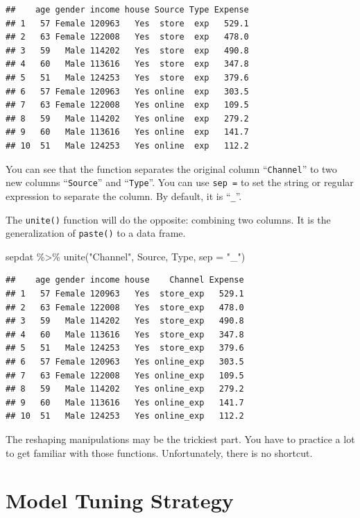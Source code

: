 \documentclass[
  12pt,
]{krantz}
\makeatletter
\newenvironment{Shaded}{\begin{snugshade}}{\end{snugshade}}
\newcommand{\AttributeTok}[1]{\textcolor[rgb]{0.61,0.61,0.61}{#1}}
\newcommand{\FunctionTok}[1]{\textcolor[rgb]{0,0,0}{#1}}
\newcommand{\NormalTok}[1]{#1}
\newcommand{\SpecialCharTok}[1]{\textcolor[rgb]{0,0,0}{#1}}
\newcommand{\StringTok}[1]{\textcolor[rgb]{0.5,0.5,0.5}{#1}}
\newenvironment{kframe}{%
\medskip{}
\setlength{\fboxsep}{.8em}
 \def\at@end@of@kframe{}%
 \ifinner\ifhmode%
  \def\at@end@of@kframe{\end{minipage}}%
  \begin{minipage}{\columnwidth}%
 \fi\fi%
 \def\FrameCommand##1{\hskip\@totalleftmargin \hskip-\fboxsep
 \colorbox{shadecolor}{##1}\hskip-\fboxsep
     \hskip-\linewidth \hskip-\@totalleftmargin \hskip\columnwidth}%
 \MakeFramed {\advance\hsize-\width
   \@totalleftmargin\z@ \linewidth\hsize
   \@setminipage}}%
 {\par\unskip\endMakeFramed%
 \at@end@of@kframe}
\renewenvironment{Shaded}{\begin{kframe}}{\end{kframe}}
\makeatother
\begin{document}
\begin{verbatim}
##    age gender income house Source Type Expense
## 1   57 Female 120963   Yes  store  exp   529.1
## 2   63 Female 122008   Yes  store  exp   478.0
## 3   59   Male 114202   Yes  store  exp   490.8
## 4   60   Male 113616   Yes  store  exp   347.8
## 5   51   Male 124253   Yes  store  exp   379.6
## 6   57 Female 120963   Yes online  exp   303.5
## 7   63 Female 122008   Yes online  exp   109.5
## 8   59   Male 114202   Yes online  exp   279.2
## 9   60   Male 113616   Yes online  exp   141.7
## 10  51   Male 124253   Yes online  exp   112.2
\end{verbatim}

You can see that the function separates the original column ``\texttt{Channel}'' to two new columns ``\texttt{Source}'' and ``\texttt{Type}''. You can use \texttt{sep\ =} to set the string or regular expression to separate the column. By default, it is ``\texttt{\_}''.

The \texttt{unite()} function will do the opposite: combining two columns. It is the generalization of \texttt{paste()} to a data frame.

\begin{Shaded}
\begin{Highlighting}[]
\NormalTok{sepdat }\SpecialCharTok{\%\textgreater{}\%} 
  \FunctionTok{unite}\NormalTok{(}\StringTok{"Channel"}\NormalTok{, Source, Type, }\AttributeTok{sep =} \StringTok{"\_"}\NormalTok{)}
\end{Highlighting}
\end{Shaded}

\begin{verbatim}
##    age gender income house    Channel Expense
## 1   57 Female 120963   Yes  store_exp   529.1
## 2   63 Female 122008   Yes  store_exp   478.0
## 3   59   Male 114202   Yes  store_exp   490.8
## 4   60   Male 113616   Yes  store_exp   347.8
## 5   51   Male 124253   Yes  store_exp   379.6
## 6   57 Female 120963   Yes online_exp   303.5
## 7   63 Female 122008   Yes online_exp   109.5
## 8   59   Male 114202   Yes online_exp   279.2
## 9   60   Male 113616   Yes online_exp   141.7
## 10  51   Male 124253   Yes online_exp   112.2
\end{verbatim}

The reshaping manipulations may be the trickiest part. You have to practice a lot to get familiar with those functions. Unfortunately, there is no shortcut.

\hypertarget{modeltuningstrategy}{%
\chapter{Model Tuning Strategy}\label{modeltuningstrategy}}
\end{document}
